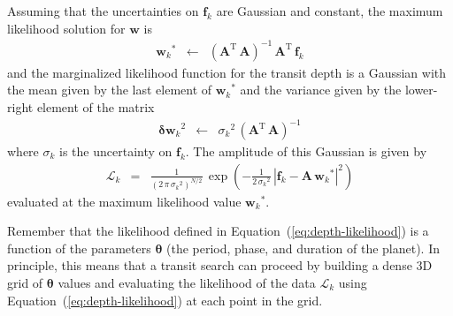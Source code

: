 \documentclass[12pt,preprint]{aastex}
\newcommand{\Eq}[1]{Equation~(\ref{eq:#1})}
\newcommand{\eq}[1]{\Eq{#1}}
\newcommand{\eqlabel}[1]{\label{eq:#1}}
\newcommand{\T}{\ensuremath{\mathrm{T}}}
\newcommand{\bvec}[1]{{\ensuremath{\boldsymbol{#1}}}}
\begin{document}
Assuming that the uncertainties on $\bvec{f}_k$ are Gaussian and constant,
the maximum likelihood solution for \bvec{w} is
\begin{eqnarray}
{\bvec{w}_k}^* &\gets& \left( \bvec{A}^\T\,\bvec{A} \right)^{-1}\,
                       \bvec{A}^\T\,\bvec{f}_k
\end{eqnarray}
and the marginalized likelihood function for the transit depth is a Gaussian
with the mean given by the last element of ${\bvec{w}_k}^*$ and the variance
given by the lower-right element of the matrix
\begin{eqnarray}
{\bvec{\delta w}_k}^2 &\gets& {\sigma_k}^2 \,
            \left( \bvec{A}^\T\,\bvec{A} \right)^{-1}
\end{eqnarray}
where $\sigma_k$ is the uncertainty on $\bvec{f}_k$.
The amplitude of this Gaussian is given by
\begin{eqnarray}\eqlabel{depth-likelihood}
\mathcal{L}_k &=& \frac{1}{(2\,\pi\,{\sigma_k}^2)^{N/2}}\,\exp\left(
-\frac{1}{2\,{\sigma_k}^2}\,
\left| \bvec{f}_k - \bvec{A}\,{\bvec{w}_k}^* \right|^2
\right)
\end{eqnarray}
evaluated at the maximum likelihood value ${\bvec{w}_k}^*$.

Remember that the likelihood defined in \eq{depth-likelihood} is a function of
the parameters \bvec{\theta} (the period, phase, and duration of the planet).
In principle, this means that a transit search can proceed by building a dense
3D grid of \bvec{\theta} values and evaluating the likelihood of the data
$\mathcal{L}_k$ using \eq{depth-likelihood} at each point in the grid.

\clearpage

\clearpage
\end{document}
